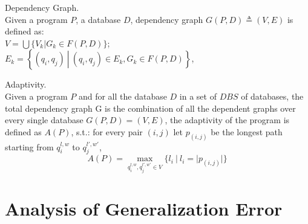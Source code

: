\documentclass[a4paper,11pt]{article}
\begin{document}
\begin{defn}
Dependency Graph.
\\
Given a program $P$, a database $D$, 
dependency graph $G(P, D) \triangleq (V, E)$ is defined as: 
\\
$V =\bigcup \{V_k | G_k \in F(P, D)  \}$;
\\
$E_k = \left\{(q_i,q_j) 
~ \left \vert ~ (q_i,q_j) \in E_k , G_k \in F(P, D) \right.\right\}$,
\end{defn}
%
%
\begin{defn}
Adaptivity.
\\
Given a program $P$ and for all the database $D$ in a set of $DBS$ of databases, the total dependency graph G is the combination of all the dependent graphs over every single database $G(P, D) = (V, E)$, the adaptivity of the program is defined as $A(P)$, s.t.:
for every pair $(i,j)$ let $p_{(i,j)}$ be the longest path starting from $q_i^{l, w}$ to $q_j^{l',w'}$,
%
$$A(P) = \max\limits_{q_i^{l,w},q_j^{l',w'} \in V }\{l_i ~|~ l_i = |p_(i,j)| \}$$
\end{defn}
%
%
\section{Analysis of Generalization Error}
\end{document}
